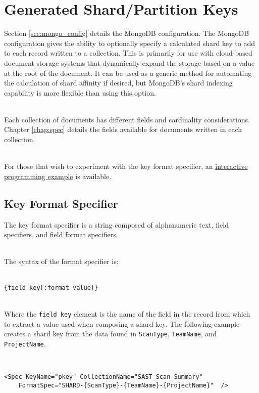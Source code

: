 \section{Generated Shard/Partition Keys}
Section \ref{sec:mongo_config} details the MongoDB configuration.  The MongoDB configuration gives the ability to optionally specify a calculated
shard key to add to each record written to a collection.  This is primarily for use with cloud-based document storage systems that dynamically
expand the storage based on a value at the root of the document.  It can be used as a generic method for automating the calculation of shard
affinity if desired, but MongoDB's shard indexing capability is more flexible than using this option.

\noindent\\Each collection of documents has different fields and cardinality considerations.  Chapter \ref{chap:spec} details the fields
available for documents written in each collection.

\noindent\\For those that wish to experiment with the key format specifier, 
an \href{https://repl.it/repls/BriskPleasingLine#main.cs}{interactive programming example} is available.


\subsection{Key Format Specifier}

The key format specifier is a string composed of alphanumeric text, field specifiers, and field format specifiers.

\noindent\\The syntax of the format specifier is:

\noindent\\\texttt{\{field key[:format value]\}}

\noindent\\Where the \texttt{field key} element is the name of the field in the record from which to extract a value used when composing a shard key.
The following example creates a shard key from the data found in \texttt{ScanType}, \texttt{TeamName}, and \texttt{ProjectName}.

\noindent\\
\lstset{language=XML}
\begin{lstlisting}
<Spec KeyName="pkey" CollectionName="SAST_Scan_Summary" 
    FormatSpec="SHARD-{ScanType}-{TeamName}-{ProjectName}"  />
\end{lstlisting}


